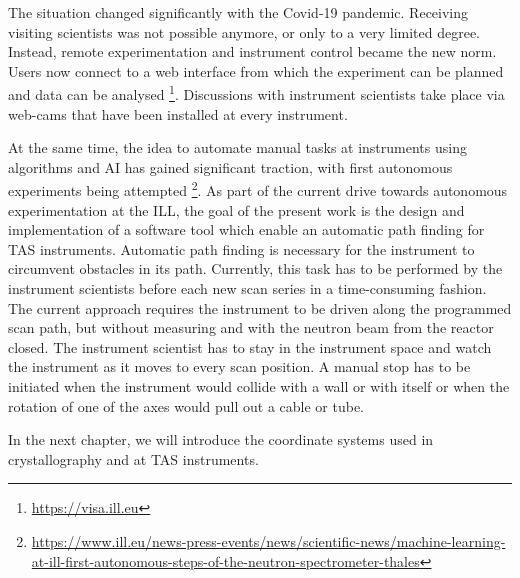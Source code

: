 The situation changed significantly with the Covid-19 pandemic. Receiving visiting scientists was not possible anymore, or only to a very limited degree. Instead, remote experimentation and instrument control became the new norm. Users now connect to a web interface from which the experiment can be planned and data can be analysed \footnote{\url{https://visa.ill.eu}}. Discussions with instrument scientists take place via web-cams that have been installed at every instrument.

At the same time, the idea to automate manual tasks at instruments using algorithms and AI has gained significant traction, with first autonomous experiments being attempted \footnote{\url{https://www.ill.eu/news-press-events/news/scientific-news/machine-learning-at-ill-first-autonomous-steps-of-the-neutron-spectrometer-thales}}.
As part of the current drive towards autonomous experimentation at the ILL, the goal of the present work is the design and implementation of a software tool which enable an automatic path finding for TAS instruments. Automatic path finding is necessary for the instrument to circumvent obstacles in its path. Currently, this task has to be performed by the instrument scientists before each new scan series in a time-consuming fashion. The current approach requires the instrument to be  driven along the programmed scan path, but without measuring and with the neutron beam from the reactor closed. The instrument scientist has to stay in the instrument space and watch the instrument as it moves to every scan position. A manual stop has to be initiated when the instrument would collide with a wall or with itself or when the rotation of one of the axes would pull out a cable or tube.

In the next chapter, we will introduce the coordinate systems used in crystallography and at TAS instruments.
